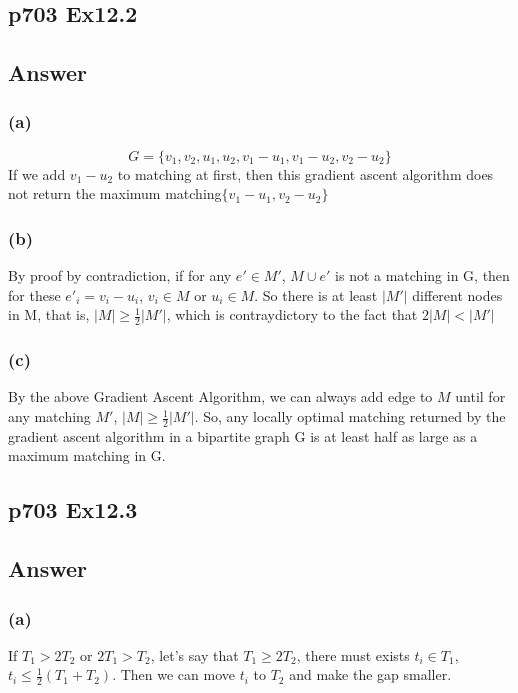 \documentclass[a4paper]{article}
\begin{document}
\subsection*{p703 Ex12.2}
\subsection*{Answer}
\subsubsection*{(a)}
$$
G = \{v_1, v_2, u_1, u_2, v_1-u_1, v_1-u_2, v_2-u_2\}
$$
If we add $v_1-u_2$ to matching at first, then this gradient ascent
algorithm does not return the maximum matching$\{v_1-u_1, v_2-u_2\}$

\subsubsection*{(b)}
By proof by contradiction, if for any $e'\in M'$, $M \cup e'$ is not a matching in G, then for these $e'_i = v_i-u_i$, $v_i \in M$ or $u_i \in M$. So there is at least $|M'|$ different nodes in M, that is, $|M| \geq \frac{1}{2}|M'|$, which is contraydictory to the fact that $2|M| < |M'|$

\subsubsection*{(c)}
By the above Gradient Ascent Algorithm, we can always add edge to $M$ until for any matching $M'$, $|M| \geq \frac{1}{2}|M'|$. So, any locally optimal matching returned by the gradient ascent algorithm in a bipartite graph G is at least half as large as a maximum matching in G.

\vspace*{2cm}

\subsection*{p703 Ex12.3}
\subsection*{Answer}
\subsubsection*{(a)}
If $T_1 > 2T_2$ or $2T_1 > T_2$, let's say that $T_1 \geq 2T_2$, there must exists $t_i \in T_1$, $t_{i} \leq \frac{1}{2}(T_1+T_2)$. Then we can move $t_i$ to $T_2$ and make the gap smaller.
\end{document}
